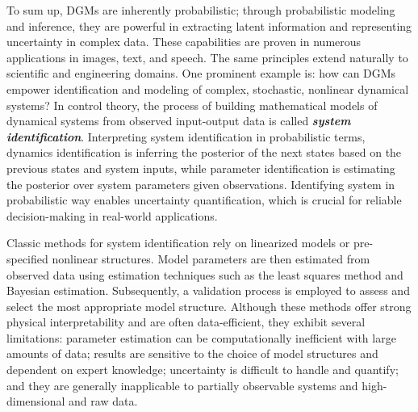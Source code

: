 To sum up, \acp{DGM} are inherently probabilistic; through probabilistic modeling and inference, they are powerful in extracting latent information and representing uncertainty in complex data. These capabilities are proven in numerous applications in images, text, and speech. The same principles extend naturally to scientific and engineering domains. One prominent example is: how can \acp{DGM} empower identification and modeling of complex, stochastic, nonlinear dynamical systems? In control theory, the process of building mathematical models of dynamical systems from observed input-output data is called {\bfseries\itshape system identification}. Interpreting system identification in probabilistic terms, dynamics identification is inferring the posterior of the next states based on the previous states and system inputs, while parameter identification is estimating the posterior over system parameters given observations. Identifying system in probabilistic way enables uncertainty quantification, which is crucial for reliable decision-making in real-world applications.

Classic methods for system identification rely on linearized models or pre-specified nonlinear structures. Model parameters are then estimated from observed data using estimation techniques such as the least squares method and Bayesian estimation. Subsequently, a validation process is employed to assess and select the most appropriate model structure. Although these methods offer strong physical interpretability and are often data-efficient, they exhibit several limitations: parameter estimation can be computationally inefficient with large amounts of data; results are sensitive to the choice of model structures and dependent on expert knowledge; uncertainty is difficult to handle and quantify; and they are generally inapplicable to partially observable systems and high-dimensional and raw data. 

